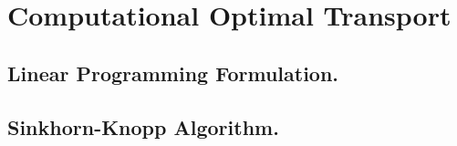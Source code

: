 \chapter{Computational Optimal Transport}
\section{Linear Programming Formulation.}
\section{Sinkhorn-Knopp Algorithm.}
